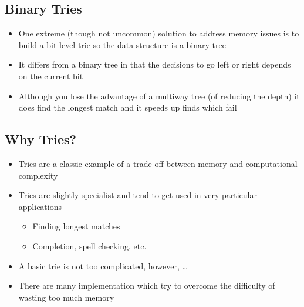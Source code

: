 
\begin{slide}
\section{Binary Tries}

\begin{PauseHighLight}
  \begin{itemize}
  \item One extreme (though not uncommon) solution to address memory
    issues is to build a bit-level trie so the data-structure is a
    binary tree\pause
  \item It differs from a binary tree in that the decisions to go left
    or right depends on the current bit\pause
  \item Although you lose the advantage of a multiway tree (of reducing
    the depth) it does find the longest match and it speeds up finds
    which fail\pause
  \end{itemize}
\end{PauseHighLight}

\end{slide}


\begin{slide}
\section{Why Tries?}

\begin{PauseHighLight}
  \begin{itemize}
  \item Tries are a classic example of a trade-off between memory and
    computational complexity\pause
  \item Tries are slightly specialist and tend to get used in very
    particular applications
    \begin{itemize}
    \item Finding longest matches
    \item Completion, spell checking, etc.\pause
    \end{itemize}
  \item A basic trie is not too complicated, however, \ldots\pause
  \item There are many implementation which try to overcome the
    difficulty of wasting too much memory\pause
  \end{itemize}
\end{PauseHighLight}

\end{slide}


